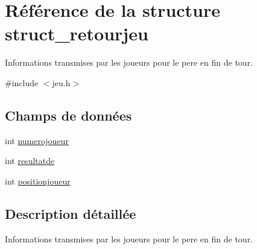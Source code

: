 \hypertarget{structstruct__retourjeu}{\section{Référence de la structure struct\-\_\-retourjeu}
\label{structstruct__retourjeu}
}


Informations transmises par les joueurs pour le pere en fin de tour.  




{\ttfamily \#include $<$jeu.\-h$>$}

\subsection*{Champs de données}
\begin{DoxyCompactItemize}
\item 
int \hyperlink{structstruct__retourjeu_a3e4028dc4a9077afc6e53e423343bd70}{numerojoueur}
\item 
int \hyperlink{structstruct__retourjeu_ac584e924232e3ffd27115c09c0fcc55d}{resultatde}
\item 
int \hyperlink{structstruct__retourjeu_a886601c5a72273d41b31c90740071a61}{positionjoueur}
\end{DoxyCompactItemize}


\subsection{Description détaillée}
Informations transmises par les joueurs pour le pere en fin de tour. 

